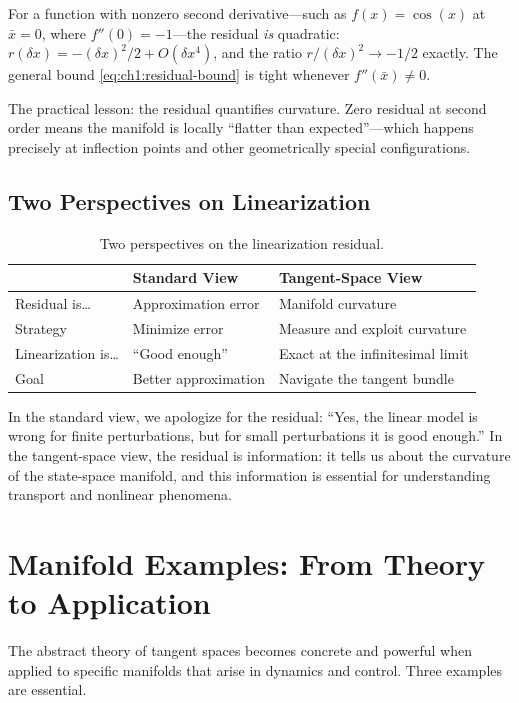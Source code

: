 For a function with nonzero second derivative---such as $f(x) = \cos(x)$ at $\bar{x} = 0$, where
$f''(0) = -1$---the residual \emph{is} quadratic: $r(\delta x) = -(\delta x)^2/2 + O(\delta x^4)$,
and the ratio $r/(\delta x)^2 \to -1/2$ exactly. The general bound
\eqref{eq:ch1:residual-bound} is tight whenever $f''(\bar{x}) \neq 0$.

The practical lesson: the residual quantifies curvature. Zero residual at second order means
the manifold is locally ``flatter than expected''---which happens precisely at inflection
points and other geometrically special configurations.

\subsection{Two Perspectives on Linearization}

\begin{table}[h]
\centering
\caption{Two perspectives on the linearization residual.}
\label{tab:ch1:perspectives}
\begin{tabular}{@{}lll@{}}
\toprule
& \textbf{Standard View} & \textbf{Tangent-Space View} \\
\midrule
Residual is\ldots & Approximation error & Manifold curvature \\
Strategy & Minimize error & Measure and exploit curvature \\
Linearization is\ldots & ``Good enough'' & Exact at the infinitesimal limit \\
Goal & Better approximation & Navigate the tangent bundle \\
\bottomrule
\end{tabular}
\end{table}

In the standard view, we apologize for the residual: ``Yes, the linear model is wrong for
finite perturbations, but for small perturbations it is good enough.'' In the tangent-space
view, the residual is information: it tells us about the curvature of the state-space manifold,
and this information is essential for understanding transport and nonlinear phenomena.


\section{Manifold Examples: From Theory to Application}

The abstract theory of tangent spaces becomes concrete and powerful when applied to specific
manifolds that arise in dynamics and control. Three examples are essential.

